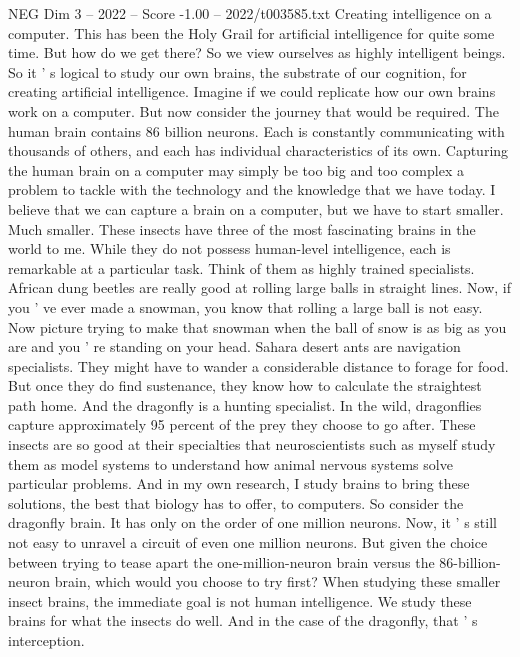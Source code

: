 \begin{textsample}{NEG Dim 3 – 2022 – Score -1.00 – 2022/t003585.txt}  \label{ex:f3_neg_062}
Creating intelligence on a computer.
This has been the Holy Grail for artificial intelligence for quite some time.
But how do we get there?
So we view ourselves as highly intelligent beings.
So it ' s logical to study our own brains, the substrate of our cognition, for creating artificial intelligence.
Imagine if we could replicate how our own brains work on a computer.
But now consider the journey that would be required.
The human brain contains 86 billion neurons.
Each is constantly communicating with thousands of others, and each has individual characteristics of its own.
Capturing the human brain on a computer may simply be too big and too complex a problem to tackle with the technology and the knowledge that we have today.
I believe that we can capture a brain on a computer, but we have to start smaller.
Much smaller.
These insects have three of the most fascinating brains in the world to me.
While they do not possess human-level intelligence, each is remarkable at a particular task.
Think of them as highly trained specialists.
African dung beetles are really good at rolling large balls in straight lines.
Now, if you ' ve ever made a snowman, you know that rolling a large ball is not easy.
Now picture trying to make that snowman when the ball of snow is as big as you are and you ' re standing on your head.
Sahara desert ants are navigation specialists.
They might have to wander a considerable distance to forage for food.
But once they do find sustenance, they know how to calculate the straightest path home.
And the dragonfly is a hunting specialist.
In the wild, dragonflies capture approximately 95 percent of the prey they choose to go after.
These insects are so good at their specialties that neuroscientists such as myself study them as model systems to understand how animal nervous systems solve particular problems.
And in my own research, I study brains to bring these solutions, the best that biology has to offer, to computers.
So consider the dragonfly brain.
It has only on the order of one million neurons.
Now, it ' s still not easy to unravel a circuit of even one million neurons.
But given the choice between trying to tease apart the one-million-neuron brain versus the 86-billion-neuron brain, which would you choose to try first?
When studying these smaller insect brains, the immediate goal is not human intelligence.
We study these brains for what the insects do well.
And in the case of the dragonfly, that ' s interception.

\end{textsample}
